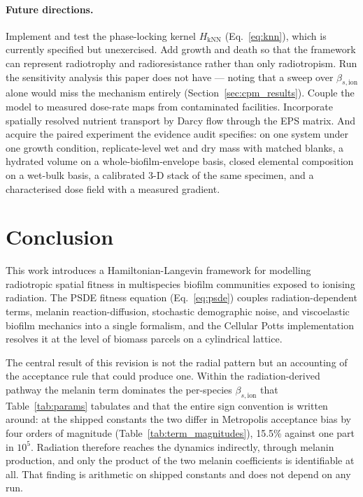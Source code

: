 \documentclass[11pt]{article}
\begin{document}
\paragraph{Future directions.}
Implement and test the phase-locking kernel $H_{\mathrm{kNN}}$ (Eq.~\ref{eq:knn}), which is
currently specified but unexercised. Add growth and death so that the framework can represent
radiotrophy and radioresistance rather than only radiotropism. Run the sensitivity analysis this
paper does not have --- noting that a sweep over $\beta_{s,\mathrm{ion}}$ alone would miss the
mechanism entirely (Section~\ref{sec:cpm_results}). Couple the model to measured dose-rate maps
from contaminated facilities. Incorporate spatially resolved nutrient transport by Darcy flow
through the EPS matrix. And acquire the paired experiment the evidence audit specifies: on one
system under one growth condition, replicate-level wet and dry mass with matched blanks, a
hydrated volume on a whole-biofilm-envelope basis, closed elemental composition on a wet-bulk
basis, a calibrated 3-D stack of the same specimen, and a characterised dose field with a measured
gradient.

\section{Conclusion}

This work introduces a Hamiltonian-Langevin framework for modelling radiotropic spatial fitness in
multispecies biofilm communities exposed to ionising radiation. The PSDE fitness equation
(Eq.~\ref{eq:psde}) couples radiation-dependent terms, melanin reaction-diffusion, stochastic
demographic noise, and viscoelastic biofilm mechanics into a single formalism, and the Cellular
Potts implementation resolves it at the level of biomass parcels on a cylindrical lattice.

The central result of this revision is not the radial pattern but an accounting of the acceptance
rule that could produce one. Within the radiation-derived pathway the melanin term dominates the
per-species $\beta_{s,\mathrm{ion}}$ that Table~\ref{tab:params} tabulates and that the entire sign
convention is written around: at the shipped constants the two differ in Metropolis acceptance bias
by four orders of magnitude (Table~\ref{tab:term_magnitudes}), 15.5\% against one part in $10^5$.
Radiation therefore reaches the dynamics indirectly, through melanin production, and only the
product of the two melanin coefficients is identifiable at all. That finding is arithmetic on
shipped constants and does not depend on any run.
\end{document}
